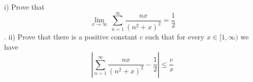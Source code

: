 i) Prove that
$$ \lim_{x\to \infty}\,\sum_{n=1}^{\infty} \frac{nx}{(n^{2}+x)^{2}}=\frac{1}{2}$$.
ii) Prove that there is a positive constant  $c$ such that for every $x\in [1,\infty)$
we have
$$\left|\sum_{n=1}^{\infty} \frac{nx}{(n^{2}+x)^{2}}-\frac{1}{2} \right| \leq \frac{c}{x}$$